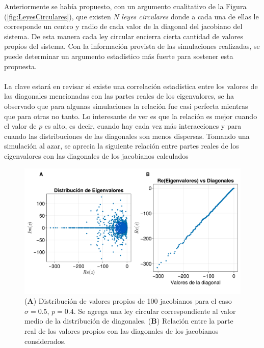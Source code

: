 Anteriormente se había propuesto, con un argumento cualitativo de la Figura (\ref{fig:LeyesCirculares}), que existen $N$ \textit{leyes circulares} donde a cada una de ellas le corresponde un centro y radio de cada valor de la diagonal del jacobiano del sistema. De esta manera cada ley circular encierra cierta cantidad de valores propios del sistema. Con la información provista de las simulaciones realizadas, se puede determinar un argumento estadístico más fuerte para sostener esta propuesta. \\
\\
La clave estará en revisar si existe una correlación estadística entre los valores de las diagonales mencionadas con las partes reales de los eigenvalores, se ha observado que para algunas simulaciones la relación fue casi perfecta mientras que para otras no tanto. Lo interesante de ver es que la relación es mejor cuando el valor de $p$ es alto, es decir, cuando hay cada vez más interacciones y para cuando las distribuciones de las diagonales son menos dispersas. Tomando una simulación al azar, se aprecia la siguiente relación entre partes reales de los eigenvalores con las diagonales de los jacobianos calculados
\begin{figure}[h!]
	\centering
	\includegraphics[scale=0.2]{../Imagenes/ReEvs-Diagonales}
	\caption{(\textbf{A}) Distribución de valores propios de 100 jacobianos para el caso $\sigma=0.5$, $p=0.4$. Se agrega una ley circular correspondiente al valor medio de la distribución de diagonales. (\textbf{B}) Relación entre la parte real de los valores propios con las diagonales de los jacobianos considerados.}
	\label{fig:ReEvs-Diagonales}
\end{figure}

